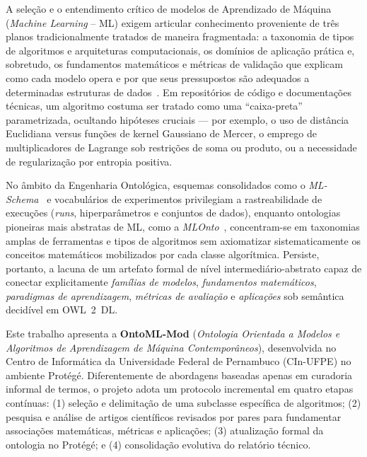 \documentclass[11pt,a4paper]{article}
\begin{document}
A seleção e o entendimento crítico de modelos de Aprendizado de Máquina (\emph{Machine Learning} -- ML) exigem articular conhecimento proveniente de três planos tradicionalmente tratados de maneira fragmentada: a taxonomia de tipos de algoritmos e arquiteturas computacionais, os domínios de aplicação prática e, sobretudo, os fundamentos matemáticos e métricas de validação que explicam como cada modelo opera e por que seus pressupostos são adequados a determinadas estruturas de dados~\cite{yin2026rapid,simoes2023gaussian}. Em repositórios de código e documentações técnicas, um algoritmo costuma ser tratado como uma ``caixa-preta'' parametrizada, ocultando hipóteses cruciais --- por exemplo, o uso de distância Euclidiana versus funções de kernel Gaussiano de Mercer, o emprego de multiplicadores de Lagrange sob restrições de soma ou produto, ou a necessidade de regularização por entropia positiva.

No âmbito da Engenharia Ontológica, esquemas consolidados como o \emph{ML-Schema}~\cite{publio2018mlschema} e vocabulários de experimentos privilegiam a rastreabilidade de execuções (\emph{runs}, hiperparâmetros e conjuntos de dados), enquanto ontologias pioneiras mais abstratas de ML, como a \emph{MLOnto}~\cite{braga2020mlonto}, concentram-se em taxonomias amplas de ferramentas e tipos de algoritmos sem axiomatizar sistematicamente os conceitos matemáticos mobilizados por cada classe algorítmica. Persiste, portanto, a lacuna de um artefato formal de nível intermediário-abstrato capaz de conectar explicitamente \emph{famílias de modelos}, \emph{fundamentos matemáticos}, \emph{paradigmas de aprendizagem}, \emph{métricas de avaliação} e \emph{aplicações} sob semântica decidível em OWL~2~DL.

Este trabalho apresenta a \textbf{OntoML-Mod} (\emph{Ontologia Orientada a Modelos e Algoritmos de Aprendizagem de Máquina Contemporâneos}), desenvolvida no Centro de Informática da Universidade Federal de Pernambuco (CIn-UFPE) no ambiente Protégé. Diferentemente de abordagens baseadas apenas em curadoria informal de termos, o projeto adota um protocolo incremental em quatro etapas contínuas: (1) seleção e delimitação de uma subclasse específica de algoritmos; (2) pesquisa e análise de artigos científicos revisados por pares para fundamentar associações matemáticas, métricas e aplicações; (3) atualização formal da ontologia no Protégé; e (4) consolidação evolutiva do relatório técnico.
\end{document}
